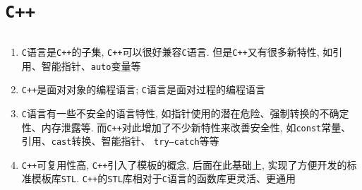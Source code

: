 \newpage
\setcounter{page}{1}
\chapter{\tt C++}
\thispagestyle{fancy}
\section{\color{blue}{基础}}

\subsection{}

\begin{enumerate}
	\item {\tt C}语言是{\tt C++}的子集, {\tt C++}可以很好兼容{\tt C}语言. 但是{\tt C++}又有很多新特性, 
			如引用、智能指针、{\tt auto}变量等
	\item {\tt C++}是面对对象的编程语言; {\tt C}语言是面对过程的编程语言
	\item {\tt C}语言有一些不安全的语言特性, 如指针使用的潜在危险、强制转换的不确定性、内存泄露等. 
			而{\tt C++}对此增加了不少新特性来改善安全性, 如{\tt const}常量、引用、{\tt cast}转换、智能指针、
			{\tt try—catch}等等
	\item {\tt C++}可复用性高, {\tt C++}引入了模板的概念, 后面在此基础上, 实现了方便开发的标准模板库{\tt STL}. 
			{\tt C++}的{\tt STL}库相对于{\tt C}语言的函数库更灵活、更通用
\end{enumerate}
